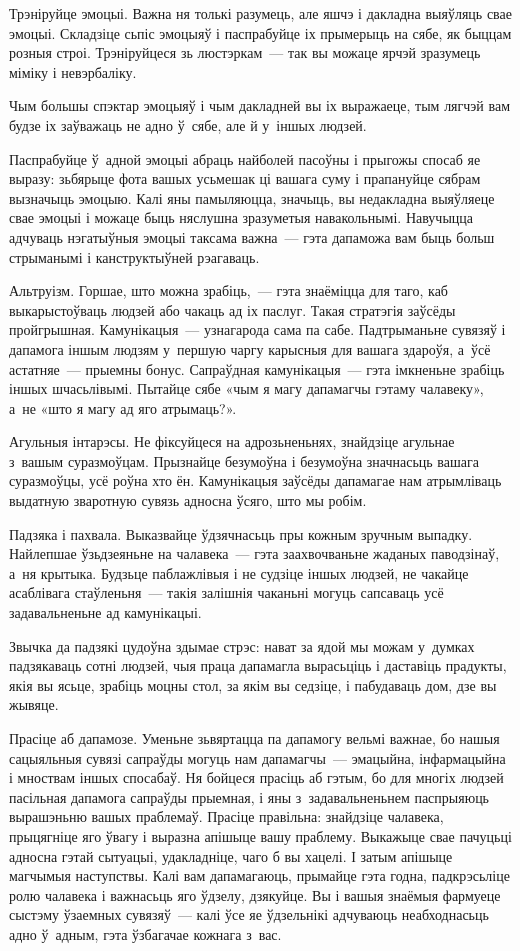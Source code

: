 Трэніруйце эмоцыі. Важна ня толькі разумець, але яшчэ і дакладна выяўляць свае эмоцыі. Складзіце сьпіс эмоцыяў і паспрабуйце іх прымерыць на сябе, як быццам розныя строі. Трэніруйцеся зь люстэркам~--- так вы можаце ярчэй зразумець міміку і невэрбаліку.

Чым большы спэктар эмоцыяў і чым дакладней вы іх выражаеце, тым лягчэй вам будзе іх заўважаць не адно ў~сябе, але й у~іншых людзей.

Паспрабуйце ў~адной эмоцыі абраць найболей пасоўны і прыгожы спосаб яе выразу: зьбярыце фота вашых усьмешак ці вашага суму і прапануйце сябрам вызначыць эмоцыю. Калі яны памыляюцца, значыць, вы недакладна выяўляеце свае эмоцыі і можаце быць няслушна зразуметыя навакольнымі. Навучыцца адчуваць нэгатыўныя эмоцыі таксама важна~--- гэта дапаможа вам быць больш стрыманымі і канструктыўней рэагаваць.

Альтруізм. Горшае, што можна зрабіць,~--- гэта знаёміцца для таго, каб выкарыстоўваць людзей або чакаць ад іх паслуг. Такая стратэгія заўсёды пройгрышная. Камунікацыя~--- узнагарода сама па сабе. Падтрыманьне сувязяў і дапамога іншым людзям у~першую чаргу карысныя для вашага здароўя, а~ўсё астатняе~--- прыемны бонус. Сапраўдная камунікацыя~--- гэта імкненьне зрабіць іншых шчасьлівымі. Пытайце сябе «чым я магу дапамагчы гэтаму чалавеку», а~не «што я магу ад яго атрымаць?».

Агульныя інтарэсы. Не фіксуйцеся на адрозьненьнях, знайдзіце агульнае з~вашым суразмоўцам. Прызнайце безумоўна і безумоўна значнасьць вашага суразмоўцы, усё роўна хто ён. Камунікацыя заўсёды дапамагае нам атрымліваць выдатную зваротную сувязь адносна ўсяго, што мы робім.

Падзяка і пахвала. Выказвайце ўдзячнасьць пры кожным зручным выпадку. Найлепшае ўзьдзеяньне на чалавека~--- гэта заахвочваньне жаданых паводзінаў, а~ня крытыка. Будзьце паблажлівыя і не судзіце іншых людзей, не чакайце асаблівага стаўленьня~--- такія залішнія чаканьні могуць сапсаваць усё задавальненьне ад камунікацыі.

Звычка да падзякі цудоўна здымае стрэс: нават за ядой мы можам у~думках падзякаваць сотні людзей, чыя праца дапамагла вырасьціць і даставіць прадукты, якія вы ясьце, зрабіць моцны стол, за якім вы седзіце, і пабудаваць дом, дзе вы жывяце.

Прасіце аб дапамозе. Уменьне зьвяртацца па дапамогу вельмі важнае, бо нашыя сацыяльныя сувязі сапраўды могуць нам дапамагчы~--- эмацыйна, інфармацыйна і мноствам іншых спосабаў. Ня бойцеся прасіць аб гэтым, бо для многіх людзей пасільная дапамога сапраўды прыемная, і яны з~задавальненьнем паспрыяюць вырашэньню вашых праблемаў. Прасіце правільна: знайдзіце чалавека, прыцягніце яго ўвагу і выразна апішыце вашу праблему. Выкажыце свае пачуцьці адносна гэтай сытуацыі, удакладніце, чаго б вы хацелі. І затым апішыце магчымыя наступствы. Калі вам дапамагаюць, прымайце гэта годна, падкрэсьліце ролю чалавека і важнасьць яго ўдзелу, дзякуйце. Вы і вашыя знаёмыя фармуеце сыстэму ўзаемных сувязяў~--- калі ўсе яе ўдзельнікі адчуваюць неабходнасьць адно ў~адным, гэта ўзбагачае кожнага з~вас.


